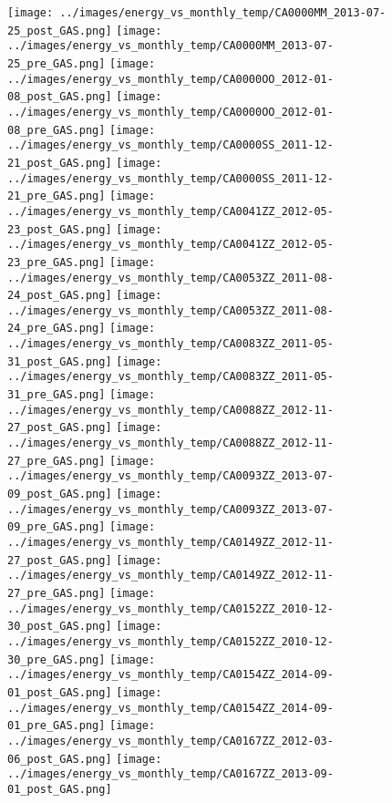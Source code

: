 \clearpage
\begin{figure}
\centering
\texttt{[image: ../images/energy\_vs\_monthly\_temp/CA0000MM\_2013-07-25\_post\_GAS.png]}
\texttt{[image: ../images/energy\_vs\_monthly\_temp/CA0000MM\_2013-07-25\_pre\_GAS.png]}
\texttt{[image: ../images/energy\_vs\_monthly\_temp/CA0000OO\_2012-01-08\_post\_GAS.png]}
\texttt{[image: ../images/energy\_vs\_monthly\_temp/CA0000OO\_2012-01-08\_pre\_GAS.png]}
\texttt{[image: ../images/energy\_vs\_monthly\_temp/CA0000SS\_2011-12-21\_post\_GAS.png]}
\texttt{[image: ../images/energy\_vs\_monthly\_temp/CA0000SS\_2011-12-21\_pre\_GAS.png]}
\texttt{[image: ../images/energy\_vs\_monthly\_temp/CA0041ZZ\_2012-05-23\_post\_GAS.png]}
\texttt{[image: ../images/energy\_vs\_monthly\_temp/CA0041ZZ\_2012-05-23\_pre\_GAS.png]}
\texttt{[image: ../images/energy\_vs\_monthly\_temp/CA0053ZZ\_2011-08-24\_post\_GAS.png]}
\texttt{[image: ../images/energy\_vs\_monthly\_temp/CA0053ZZ\_2011-08-24\_pre\_GAS.png]}
\texttt{[image: ../images/energy\_vs\_monthly\_temp/CA0083ZZ\_2011-05-31\_post\_GAS.png]}
\texttt{[image: ../images/energy\_vs\_monthly\_temp/CA0083ZZ\_2011-05-31\_pre\_GAS.png]}
\texttt{[image: ../images/energy\_vs\_monthly\_temp/CA0088ZZ\_2012-11-27\_post\_GAS.png]}
\texttt{[image: ../images/energy\_vs\_monthly\_temp/CA0088ZZ\_2012-11-27\_pre\_GAS.png]}
\texttt{[image: ../images/energy\_vs\_monthly\_temp/CA0093ZZ\_2013-07-09\_post\_GAS.png]}
\texttt{[image: ../images/energy\_vs\_monthly\_temp/CA0093ZZ\_2013-07-09\_pre\_GAS.png]}
\texttt{[image: ../images/energy\_vs\_monthly\_temp/CA0149ZZ\_2012-11-27\_post\_GAS.png]}
\texttt{[image: ../images/energy\_vs\_monthly\_temp/CA0149ZZ\_2012-11-27\_pre\_GAS.png]}
\texttt{[image: ../images/energy\_vs\_monthly\_temp/CA0152ZZ\_2010-12-30\_post\_GAS.png]}
\texttt{[image: ../images/energy\_vs\_monthly\_temp/CA0152ZZ\_2010-12-30\_pre\_GAS.png]}
\texttt{[image: ../images/energy\_vs\_monthly\_temp/CA0154ZZ\_2014-09-01\_post\_GAS.png]}
\texttt{[image: ../images/energy\_vs\_monthly\_temp/CA0154ZZ\_2014-09-01\_pre\_GAS.png]}
\texttt{[image: ../images/energy\_vs\_monthly\_temp/CA0167ZZ\_2012-03-06\_post\_GAS.png]}
\texttt{[image: ../images/energy\_vs\_monthly\_temp/CA0167ZZ\_2013-09-01\_post\_GAS.png]}
\end{figure}
